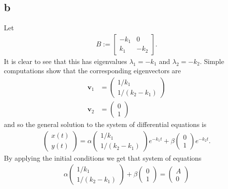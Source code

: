 \documentclass{unswmaths}
\begin{document}
\subsection*{b}
Let
\begin{align*}
   B := \left[
        \begin{array}{cc}
            -k_1 & 0 \\
            k_1 & - k_2
        \end{array}
        \right].
\end{align*}
It is clear to see that this has eigenvalues $ \lambda_1 = -k_1 $ and $ \lambda_2 = -k_2 $. Simple computations show that the corresponding eigenvectors are
\begin{align*}
    \mathbf{v}_1 &= \left( \begin{array}{c} 1/k_1 \\ 1/(k_2-k_1) \end{array}\right) \\
    \mathbf{v}_2 &= \left( \begin{array}{c} 0 \\ 1 \end{array}\right)  
\end{align*}
and so the general solution to the system of differential equations is
\begin{align*}
    \left( \begin{array}{c} x(t) \\ y(t) \end{array} \right) = \alpha \left( \begin{array}{c} 1/k_1 \\ 1/(k_2 - k_1) \end{array}\right) e^{-k_1 t} +  \beta \left( \begin{array}{c} 0 \\ 1 \end{array}\right) e^{-k_2 t}.
\end{align*}
By applying the initial conditions we get that system of equations
\begin{align}
    \alpha \left( \begin{array}{c} 1 / k_1 \\ 1 / (k_2 - k_1) \end{array} \right) + \beta \left( \begin{array}{c} 0 \\ 1 \end{array} \right) = \left( \begin{array}{c} A \\ 0 \end{array}\right)
\end{align}
\end{document}
